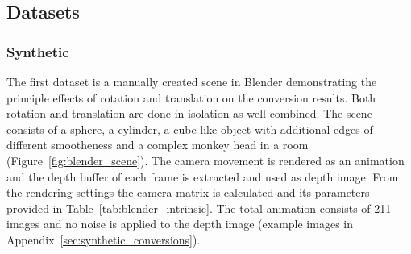 \subsection{Datasets}


\subsubsection{Synthetic}

The first dataset is a manually created scene in Blender\cite{blender} demonstrating the principle effects of rotation and translation on the conversion results.
Both rotation and translation are done in isolation as well combined.
The scene consists of a sphere, a cylinder, a cube-like object with additional edges of different smootheness and a complex monkey head in a room (Figure~\ref{fig:blender_scene}).
The camera movement is rendered as an animation and the depth buffer of each frame is extracted and used as depth image.
From the rendering settings the camera matrix is calculated and its parameters provided in Table~\ref{tab:blender_intrinsic}.
The total animation consists of 211 images and no noise is applied to the depth image (example images in Appendix~\ref{sec:synthetic_conversions}).
